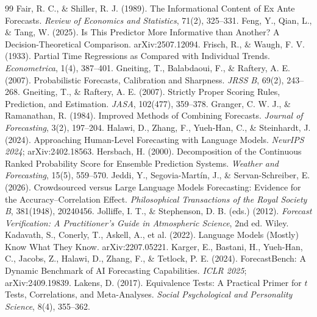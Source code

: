 \documentclass[11pt]{article}
\begin{document}
\begin{thebibliography}{99}
 Fair, R. C., \& Shiller, R. J. (1989). The Informational Content of Ex Ante Forecasts. \emph{Review of Economics and Statistics}, 71(2), 325--331.
 Feng, Y., Qian, L., \& Tang, W. (2025). Is This Predictor More Informative than Another? A Decision-Theoretical Comparison. arXiv:2507.12094.
 Frisch, R., \& Waugh, F. V. (1933). Partial Time Regressions as Compared with Individual Trends. \emph{Econometrica}, 1(4), 387--401.
 Gneiting, T., Balabdaoui, F., \& Raftery, A. E. (2007). Probabilistic Forecasts, Calibration and Sharpness. \emph{JRSS B}, 69(2), 243--268.
 Gneiting, T., \& Raftery, A. E. (2007). Strictly Proper Scoring Rules, Prediction, and Estimation. \emph{JASA}, 102(477), 359--378.
 Granger, C. W. J., \& Ramanathan, R. (1984). Improved Methods of Combining Forecasts. \emph{Journal of Forecasting}, 3(2), 197--204.
 Halawi, D., Zhang, F., Yueh-Han, C., \& Steinhardt, J. (2024). Approaching Human-Level Forecasting with Language Models. \emph{NeurIPS 2024}; arXiv:2402.18563.
 Hersbach, H. (2000). Decomposition of the Continuous Ranked Probability Score for Ensemble Prediction Systems. \emph{Weather and Forecasting}, 15(5), 559--570.
 Jeddi, Y., Segovia-Mart\'in, J., \& Servan-Schreiber, E. (2026). Crowdsourced versus Large Language Models Forecasting: Evidence for the Accuracy--Correlation Effect. \emph{Philosophical Transactions of the Royal Society B}, 381(1948), 20240456.
 Jolliffe, I. T., \& Stephenson, D. B. (eds.) (2012). \emph{Forecast Verification: A Practitioner's Guide in Atmospheric Science}, 2nd ed. Wiley.
 Kadavath, S., Conerly, T., Askell, A., et al. (2022). Language Models (Mostly) Know What They Know. arXiv:2207.05221.
 Karger, E., Bastani, H., Yueh-Han, C., Jacobs, Z., Halawi, D., Zhang, F., \& Tetlock, P. E. (2024). ForecastBench: A Dynamic Benchmark of AI Forecasting Capabilities. \emph{ICLR 2025}; arXiv:2409.19839.
 Lakens, D. (2017). Equivalence Tests: A Practical Primer for $t$ Tests, Correlations, and Meta-Analyses. \emph{Social Psychological and Personality Science}, 8(4), 355--362.

\end{thebibliography}
\end{document}
